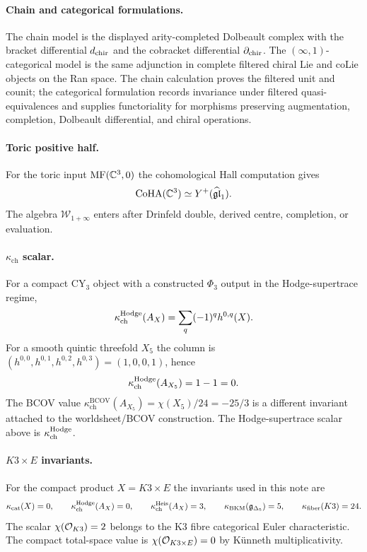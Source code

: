 \paragraph{Chain and categorical formulations.}
The chain model is the displayed arity-completed Dolbeault complex with
the bracket differential $d_{\mathrm{chir}}$ and the cobracket differential
$\partial_{\mathrm{chir}}$.  The $(\infty,1)$-categorical model is the same
adjunction in complete filtered chiral Lie and coLie objects on the Ran
space.  The chain calculation proves the filtered unit and counit; the
categorical formulation records invariance under filtered
quasi-equivalences and supplies functoriality for morphisms preserving
augmentation, completion, Dolbeault differential, and chiral
operations.

\paragraph{Toric positive half.}
For the toric input $\mathrm{MF}(\mathbb{C}^3,0)$ the cohomological Hall computation
gives
\[
  \mathrm{CoHA}(\mathbb{C}^3)\simeq Y^+(\widehat{\mathfrak{gl}}_1).
\]
The algebra $\mathcal W_{1+\infty}$ enters after Drinfeld double,
derived centre, completion, or evaluation.

\paragraph{\texorpdfstring{$\kappa_{\mathrm{ch}}$}{chiral characteristic} scalar.}
For a compact CY$_3$ object with a constructed $\Phi_3$ output in the
Hodge-supertrace regime,
\[
  \kappa_{\mathrm{ch}}^{\mathrm{Hodge}}(A_X)
  =
  \sum_q (-1)^q h^{0,q}(X).
\]
For a smooth quintic threefold $X_5$ the column is
$(h^{0,0},h^{0,1},h^{0,2},h^{0,3})=(1,0,0,1)$, hence
\[
  \kappa_{\mathrm{ch}}^{\mathrm{Hodge}}(A_{X_5})=1-1=0.
\]
The BCOV value $\kappa_{\mathrm{ch}}^{\mathrm{BCOV}}(A_{X_5})
=\chi(X_5)/24=-25/3$ is a different invariant attached to the
worldsheet/BCOV construction.  The Hodge-supertrace scalar above is
\(\kappa_{\mathrm{ch}}^{\mathrm{Hodge}}\).

\paragraph{\texorpdfstring{$K3 \times E$}{K3 x E} invariants.}
For the compact product $X=K3\times E$ the invariants used in this note
are
\[
  \kappa_{\mathrm{cat}}(X)=0,\qquad
  \kappa_{\mathrm{ch}}^{\mathrm{Hodge}}(A_X)=0,\qquad
  \kappa_{\mathrm{ch}}^{\mathrm{Heis}}(A_X)=3,\qquad
  \kappa_{\mathrm{BKM}}(\mathfrak g_{\Delta_5})=5,\qquad
  \kappa_{\mathrm{fiber}}(K3)=24.
\]
The scalar $\chi(\mathcal{O}_{K3})=2$ belongs to the K3 fibre categorical Euler
characteristic.  The compact total-space value is
$\chi(\mathcal{O}_{K3\times E})=0$ by K\"unneth multiplicativity.

